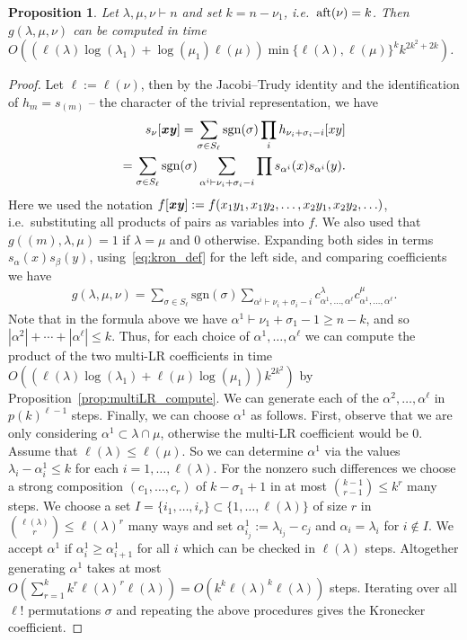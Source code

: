 \documentclass[11pt]{amsart}
\newtheorem{prop}[thm]{Proposition}
\theoremstyle{plain}
\theoremstyle{definition}
\numberwithin{equation}{section}
\def\bx{{\textbf{\textit{x}}}}
\def\by{{\textbf{\textit{y}}}}
\newcommand{\la}{\lambda}
\newcommand{\al}{\alpha}
\newcommand{\be}{\beta}
\def\sgn{\mathrm{sgn}}
\def\sgn{\mathrm{sgn}}
\def\la{\lambda}
\begin{document}
\begin{prop}\label{prop:kron_k}
Let $\la,\mu,\nu \vdash n$ and set $k=n-\nu_1$, i.e.\ ${\rm aft}(\nu)=k$. Then
$g(\la,\mu,\nu)$ can be computed in time $O(( \ell(\la)\log(\la_1)+\log(\mu_1)\ell(\mu)) \min\{\ell(\la),\ell(\mu)\}^k  k^{2k^2+2k})$.
\end{prop}

\begin{proof}
Let $\ell:=\ell(\nu)$, then by the Jacobi--Trudy identity and the identification of $h_m=s_{(m)}$ -- the character of the trivial representation, we have
\begin{align*}
s_\nu[\bx\by] = \sum_{\sigma \in S_{\ell} } \sgn(\sigma) \prod_i h_{\nu_i+\sigma_i-i} [xy] \\
= \sum_{\sigma \in S_{\ell} } \sgn(\sigma) \sum_{\al^i \vdash \nu_i+\sigma_i-i} \prod s_{\al^i}(x) s_{\al^i}(y). 
\end{align*} 
Here we used the notation $f[\bx\by]:=f(x_1y_1,x_1y_2,\ldots,x_2y_1,x_2y_2,\ldots)$, i.e.\ substituting all products of pairs as variables into $f$. We also used that $g( (m), \la,\mu)=1$ if $\la=\mu$ and 0 otherwise. 
Expanding both sides in terms $s_\al(x)s_\be(y)$, using~\eqref{eq:kron_def} for the left side, and comparing coefficients we have
\begin{align}
g(\la,\mu,\nu) = \sum_{\sigma \in S_{\ell} } \sgn(\sigma) \sum_{\al^i \vdash \nu_i+\sigma_i-i} c^\la_{\al^1,\ldots,\al^\ell} c^\mu_{\al^1,\ldots,\al^\ell}.
\end{align}
Note that in the formula above we have $\al^1 \vdash \nu_1 + \sigma_1-1 \geq n-k$, and so $|\al^2|+\cdots+|\al^\ell| \leq k$. Thus, for each choice of $\al^1,\ldots,\al^\ell$ we can compute the product of the two multi-LR coefficients in time $O( (\ell(\la)  \log(\la_1)+ \ell(\mu) \log(\mu_1) ) k^{2k^2})$ by Proposition~\ref{prop:multiLR_compute}. We can generate each of the $\al^2,\ldots,\al^\ell$ in $p(k)^{\ell-1}$ steps. Finally, we can choose $\al^1$  as follows. First, observe that we are only considering $\al^1 \subset \la\cap \mu$, otherwise the multi-LR coefficient would be 0. Assume that $\ell(\la)\leq \ell(\mu)$. So we can determine $\al^1$ via the values  $\la_i - \al^1_i \leq k$ for each $i=1,\ldots,\ell(\la)$.  For the nonzero such differences we choose a strong composition $(c_1,\ldots,c_r)$ of $k -\sigma_1+1$ in at most $\binom{k-1}{r-1}\leq k^r$ many steps. We choose a set $I=\{i_1,\ldots,i_r\} \subset \{1,\ldots,\ell(\la)\}$ of size $r$ in $\binom{\ell(\la)}{r} \leq \ell(\la)^r$ many ways and set $\al^1_{i_j}:=\la_{i_j}-c_j$ and $\al_i=\la_i$ for $i \not \in I$. We accept $\al^1$ if $\al^1_i\geq \al^1_{i+1}$ for all $i$ which can be checked in $\ell(\la)$ steps. Altogether generating $\al^1$ takes at most $O(\sum_{r=1}^k k^r \ell(\la)^r \ell(\la))=O(k^k\ell(\la)^k \ell(\la))$ steps.
Iterating over all $\ell!$ permutations $\sigma$ and repeating the above procedures gives the Kronecker coefficient. 



\end{proof}
\end{document}
